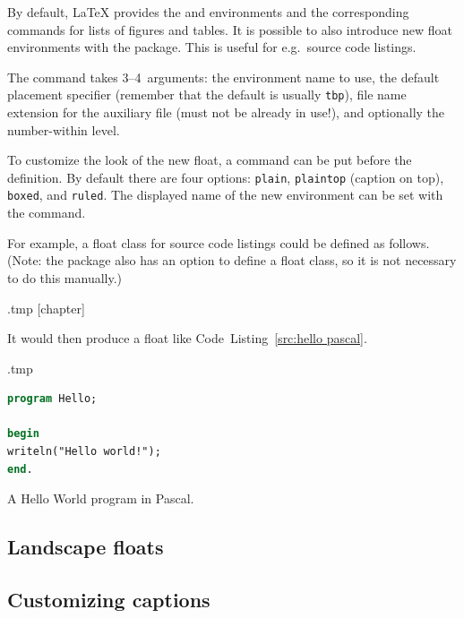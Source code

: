 By default, \LaTeX{} provides the  and  environments
and the corresponding commands for lists of figures and tables.
It is possible to also introduce new float environments with the  package.
This is useful for e.g.\ source code listings.

The  command takes 3--4~arguments:
the environment name to use,
the default placement specifier (remember that the default is usually \verb|tbp|),
file name extension for the auxiliary file (must not be already in use!),
and optionally the number-within level.

To customize the look of the new float,
a  command can be put before the definition.
By default there are four options: \verb|plain|, \verb|plaintop| (caption on top),
\verb|boxed|, and \verb|ruled|.
The displayed name of the new environment can be set with the  command.

For example, a float class for source code listings could be defined as follows.
(Note: the  package also has an option to define a float class,
so it is not necessary to do this manually.)
%
\begin{VerbatimOut}{\jobname.tmp}
[chapter]
\end{VerbatimOut}
\ExecuteExample  

It would then produce a float like Code~Listing~\ref{src:hello pascal}.
%
\begin{VerbatimOut}{\jobname.tmp}
\begin{sourcecode}[h]
\begin{lstlisting}[language=Pascal]
program Hello;

begin
writeln("Hello world!");
end.
\end{lstlisting}
\caption{A Hello World program in Pascal.}
\label{src:hello pascal}
\end{sourcecode}
\end{VerbatimOut}
\ExecuteExample


%
%
\subsection{Landscape floats}\label{sec:landscape floats}



%
%
\subsection{Customizing captions}

